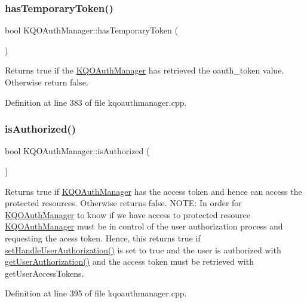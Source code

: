 \subsubsection{\texorpdfstring{has\+Temporary\+Token()}{hasTemporaryToken()}}
{\footnotesize\ttfamily bool K\+Q\+O\+Auth\+Manager\+::has\+Temporary\+Token (\begin{DoxyParamCaption}{ }\end{DoxyParamCaption})}

Returns true if the \hyperlink{class_k_q_o_auth_manager}{K\+Q\+O\+Auth\+Manager} has retrieved the oauth\+\_\+token value. Otherwise return false. 

Definition at line 383 of file kqoauthmanager.\+cpp.

\mbox{\label{class_k_q_o_auth_manager_ad16edf00de0367e95f0b04b9de97ba32}} 
\subsubsection{\texorpdfstring{is\+Authorized()}{isAuthorized()}}
{\footnotesize\ttfamily bool K\+Q\+O\+Auth\+Manager\+::is\+Authorized (\begin{DoxyParamCaption}{ }\end{DoxyParamCaption})}

Returns true if \hyperlink{class_k_q_o_auth_manager}{K\+Q\+O\+Auth\+Manager} has the access token and hence can access the protected resources. Otherwise returns false. N\+O\+TE\+: In order for \hyperlink{class_k_q_o_auth_manager}{K\+Q\+O\+Auth\+Manager} to know if we have access to protected resource \hyperlink{class_k_q_o_auth_manager}{K\+Q\+O\+Auth\+Manager} must be in control of the user authorization process and requesting the acess token. Hence, this returns true if \hyperlink{class_k_q_o_auth_manager_a55409df469317596b81ab50823eb6a97}{set\+Handle\+User\+Authorization()} is set to true and the user is authorized with \hyperlink{class_k_q_o_auth_manager_ab33a5aead44d35476d13152f4a35700b}{get\+User\+Authorization()} and the access token must be retrieved with get\+User\+Access\+Tokens. 

Definition at line 395 of file kqoauthmanager.\+cpp.

\mbox{\label{class_k_q_o_auth_manager_a2286fa49c7d21a46361cdac897efb726}} 

